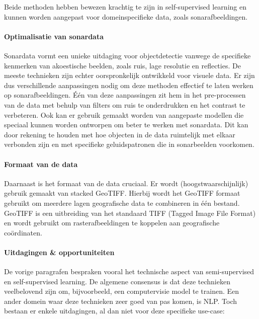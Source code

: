 Beide methoden hebben bewezen krachtig te zijn in self-supervised learning en kunnen worden aangepast voor domeinspecifieke data, zoals sonarafbeeldingen.

\paragraph{Optimalisatie van sonardata}

Sonardata vormt een unieke uitdaging voor objectdetectie vanwege de specifieke kenmerken van akoestische beelden, zoals ruis, lage resolutie en reflecties. De meeste technieken zijn echter oorspronkelijk ontwikkeld voor visuele data. Er zijn dus verschillende aanpassingen nodig om deze methoden effectief te laten werken op sonarafbeeldingen. Één van deze aanpassingen zit hem in het pre-processen van de data met behulp van filters om ruis te onderdrukken en het contrast te verbeteren. Ook kan er gebruik gemaakt worden van aangepaste modellen die speciaal kunnen worden ontworpen om beter te werken met sonardata. Dit kan door rekening te houden met hoe objecten in de data ruimtelijk met elkaar verbonden zijn en met specifieke geluidspatronen die in sonarbeelden voorkomen. \autocite{Karimanzira_2020}

\paragraph{Formaat van de data}

Daarnaast is het formaat van de data cruciaal. Er wordt (hoogstwaarschijnlijk) gebruik gemaakt van stacked GeoTIFF. Hierbij wordt het GeoTIFF formaat gebruikt om meerdere lagen geografische data te combineren in één bestand. GeoTIFF is een uitbreiding van het standaard TIFF (Tagged Image File Format) en wordt gebruikt om rasterafbeeldingen te koppelen aan geografische coördinaten. \autocite{Ritter_1997}

\paragraph{Uitdagingen \& opportuniteiten}

De vorige paragrafen bespraken vooral het technische aspect van semi-supervised en self-supervised learning. De algemene consensus is dat deze technieken veelbelovend zijn om, bijvoorbeeld, een computervisie model te trainen. Een ander domein waar deze technieken zeer goed van pas komen, is NLP. Toch bestaan er enkele uitdagingen, al dan niet voor deze specifieke use-case:

